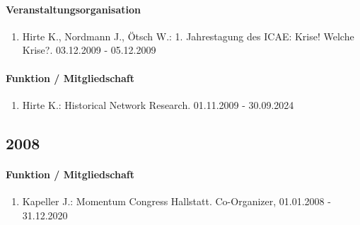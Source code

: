 \paragraph{Veranstaltungsorganisation}
\begin{enumerate}[leftmargin=*, labelsep=0.5cm]
\item Hirte K., Nordmann J., Ötsch W.: 1. Jahrestagung des ICAE: Krise! Welche Krise?. 03.12.2009 - 05.12.2009
\end{enumerate}

\paragraph{Funktion / Mitgliedschaft}
\begin{enumerate}[leftmargin=*, labelsep=0.5cm]
\item Hirte K.: Historical Network Research. 01.11.2009 - 30.09.2024
\end{enumerate}
\subsection*{2008}
\paragraph{Funktion / Mitgliedschaft}
\begin{enumerate}[leftmargin=*, labelsep=0.5cm]
\item Kapeller J.: Momentum Congress Hallstatt. Co-Organizer, 01.01.2008 - 31.12.2020
\end{enumerate}